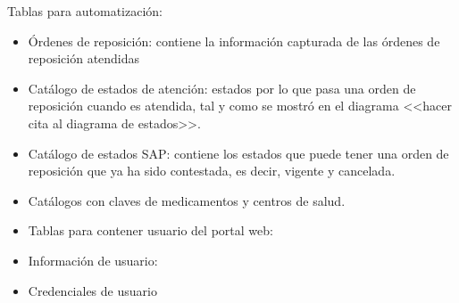 Tablas para automatización:
\begin{itemize}
	\item Órdenes de reposición: contiene la información capturada de las órdenes de reposición atendidas
	\item Catálogo de estados de atención: estados por lo que pasa una orden de reposición cuando es atendida, tal y como se mostró en el diagrama <<hacer cita al diagrama de estados>>.
	\item Catálogo de estados SAP: contiene los estados que puede tener una orden de reposición que ya ha sido contestada, es decir, vigente y cancelada.
	\item Catálogos con claves de medicamentos y centros de salud.
	\item Tablas para contener usuario del portal web:
	\item Información de usuario: 
	\item Credenciales de usuario
\end{itemize}


%
%
%
%
%
%
%
%
%
%
%
%
%
%
%
%



